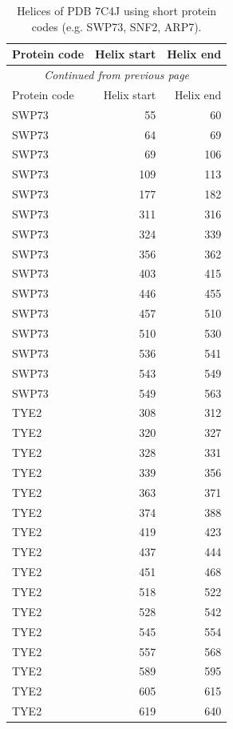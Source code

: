 \begin{longtable}{@{}lrr@{}}
  \toprule
  Protein code & Helix start & Helix end \\
  \midrule
  \endfirsthead
  \multicolumn{3}{c}{\textit{Continued from previous page}} \\
  \toprule Protein code & Helix start & Helix end \\ \midrule
  \endhead
  \bottomrule
  \endfoot
  \bottomrule
  \caption{Helices of PDB 7C4J using short protein codes (e.g. SWP73, SNF2, ARP7).}
  \label{tab:7c4j_helices_v1}
  \endlastfoot
  SWP73 & 55 & 60 \\
  SWP73 & 64 & 69 \\
  SWP73 & 69 & 106 \\
  SWP73 & 109 & 113 \\
  SWP73 & 177 & 182 \\
  SWP73 & 311 & 316 \\
  SWP73 & 324 & 339 \\
  SWP73 & 356 & 362 \\
  SWP73 & 403 & 415 \\
  SWP73 & 446 & 455 \\
  SWP73 & 457 & 510 \\
  SWP73 & 510 & 530 \\
  SWP73 & 536 & 541 \\
  SWP73 & 543 & 549 \\
  SWP73 & 549 & 563 \\
  TYE2 & 308 & 312 \\
  TYE2 & 320 & 327 \\
  TYE2 & 328 & 331 \\
  TYE2 & 339 & 356 \\
  TYE2 & 363 & 371 \\
  TYE2 & 374 & 388 \\
  TYE2 & 419 & 423 \\
  TYE2 & 437 & 444 \\
  TYE2 & 451 & 468 \\
  TYE2 & 518 & 522 \\
  TYE2 & 528 & 542 \\
  TYE2 & 545 & 554 \\
  TYE2 & 557 & 568 \\
  TYE2 & 589 & 595 \\
  TYE2 & 605 & 615 \\
  TYE2 & 619 & 640 \\

\end{longtable}
